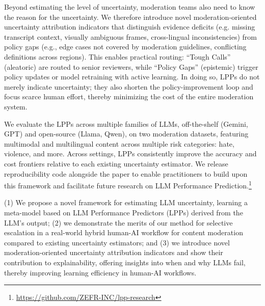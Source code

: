 Beyond estimating the level of uncertainty, moderation teams also need to know the reason for the uncertainty. We therefore introduce novel moderation-oriented uncertainty attribution indicators that distinguish evidence deficits (e.g. missing transcript context, visually ambiguous frames, cross-lingual inconsistencies) from policy gaps (e.g., edge cases not covered by moderation guidelines, conflicting definitions across regions).
This enables practical routing: “Tough Calls” (aleatoric) are routed to senior reviewers, while “Policy Gaps” (epistemic) trigger policy updates or model retraining with active learning. In doing so, LPPs do not merely indicate uncertainty; they also shorten the policy-improvement loop and focus scarce human effort, thereby minimizing the cost of the entire moderation system.

We evaluate the LPPs across multiple families of LLMs, off-the-shelf (Gemini, GPT) and open-source (Llama, Qwen), on two moderation datasets, featuring multimodal and multilingual content across multiple risk categories: hate, violence, and more. Across settings, LPPs consistently improve the accuracy and cost frontiers relative to each existing uncertainty estimator. We release reproducibility code alongside the paper to enable practitioners to build upon this framework and facilitate future research on LLM Performance Prediction.\footnote{\url{https://github.com/ZEFR-INC/lpp-research}}

(1) We propose a novel framework for estimating LLM uncertainty, learning a meta-model based on LLM Performance Predictors (LPPs) derived from the LLM's output; (2) we demonstrate the merits of our method for selective escalation in a real-world hybrid human-AI workflow for content moderation compared to existing uncertainty estimators; and (3) we introduce novel moderation-oriented uncertainty attribution indicators and show their contribution to explainability, offering insights into when and why LLMs fail, thereby improving learning efficiency in human-AI workflows.




